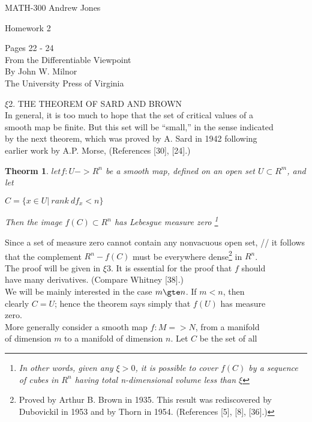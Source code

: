 \documentclass{book}
\newtheorem*{theorem}{Theorm}
\begin{document}
  MATH-300 \hfill Andrew Jones
  \begin{center} Homework 2 \end{center}
  \begin{center}
    Pages 22 - 24 \\
    From the Differentiable Viewpoint \\
    By John W. Milnor \\
    The University Press of Virginia
  \end{center}
  $\xi$2. THE THEOREM OF SARD AND BROWN \\
  In general, it is too much to hope that the set of critical values of a \\ smooth map be finite. But this set will be ``small,'' in the sense indicated\\ by the next theorem, which was proved by A. Sard in 1942 following\\ earlier work by A.P. Morse, (References [30], [24].)
  \begin{theorem}
  $let f : U -> R^n$ be a smooth map, defined on an open set $U \subset R^m$, and let
  \begin{center}
  $C = \{x\in U|\ rank\ df_{x} < n \}$
  \end{center}
  Then the image $f(C) \subset R^n$ has Lebesgue measure zero \footnote[1]{In other words, given any $\xi > 0$, it is possible to cover $f(C)$ by a sequence of cubes in $R^n$ having total n-dimensional volume less than $\xi$ }
  \end{theorem}
  Since a set of measure zero cannot contain any nonvacuous open set, //
  it follows that the complement $R^n - f(C)$ must be everywhere dense\footnote[1]{Proved by Arthur B. Brown in 1935. This result was rediscovered by Dubovickil in 1953 and by Thorn in 1954. (References [5], [8], [36].)} in $R^n$. \\
  The proof will be given in $\xi3$. It is essential for the proof that $f$ should \\
  have many derivatives. (Compare Whitney [38].) \\
  We will be mainly interested in the case $m \gte n$. If $m < n$, then \\
  clearly $C = U$; hence the theorem says simply that $f(U)$ has measure \\
  zero. \\
  More generally consider a smooth map $f : M => N$, from a manifold \\
  of dimension $m$ to a manifold of dimension $n$. Let $C$ be the set of all \\
\end{document}
